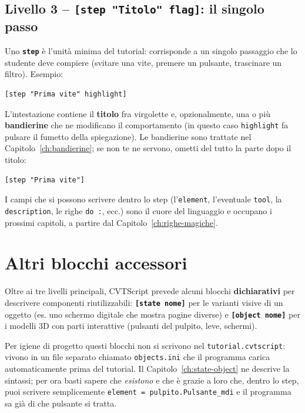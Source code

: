 ﻿\documentclass[a4paper,12pt,oneside]{book}
\newcommand{\kw}[1]{\texttt{\color{keycolor}#1}}
\newcommand{\val}[1]{\texttt{\color{cvtgreen}#1}}
\newcommand{\sez}[1]{\texttt{\color{sectioncolor}\textbf{#1}}}
\newcommand{\file}[1]{\texttt{#1}}
\begin{document}
\subsection{Livello 3 -- \texttt{[step "Titolo" flag]}: il singolo passo}

Uno \sez{step} è l'unità minima del tutorial: corrisponde a un singolo
passaggio che lo studente deve compiere (svitare una vite, premere un
pulsante, trascinare un filtro). Esempio:

\begin{lstlisting}
[step "Prima vite" highlight]
\end{lstlisting}

L'intestazione contiene il \textbf{titolo} fra virgolette e, opzionalmente,
una o più \textbf{bandierine} che ne modificano il comportamento (in questo
caso \val{highlight} fa pulsare il fumetto della spiegazione). Le bandierine
sono trattate nel Capitolo~\ref{ch:bandierine}; se non te ne servono, ometti
del tutto la parte dopo il titolo:

\begin{lstlisting}
[step "Prima vite"]
\end{lstlisting}

I campi che si possono scrivere dentro lo step (l'\kw{element}, l'eventuale
\kw{tool}, la \kw{description}, le righe \kw{do :}, ecc.) sono il cuore del
linguaggio e occupano i prossimi capitoli, a partire dal
Capitolo~\ref{ch:righe-magiche}.

\section{Altri blocchi accessori}

Oltre ai tre livelli principali, CVTScript prevede alcuni blocchi
\textbf{dichiarativi} per descrivere componenti riutilizzabili:
\sez{[state nome]} per le varianti visive di un oggetto (es. uno schermo
digitale che mostra pagine diverse) e \sez{[object nome]} per i modelli 3D
con parti interattive (pulsanti del pulpito, leve, schermi).

Per igiene di progetto questi blocchi non si scrivono nel
\file{tutorial.cvtscript}: vivono in un file separato chiamato
\file{objects.ini} che il programma carica automaticamente prima del
tutorial. Il Capitolo~\ref{ch:state-object} ne descrive la sintassi; per ora
basti sapere che \emph{esistono} e che è grazie a loro che, dentro lo step,
puoi scrivere semplicemente \kw{element = pulpito.Pulsante\_mdi} e il
programma sa già di che pulsante si tratta.
\end{document}
